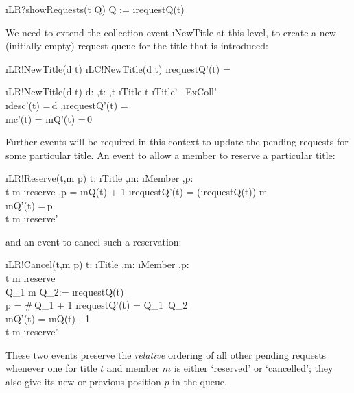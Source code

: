 \documentclass[12pt,a4paper]{article}
\begin{document}
\begin{showspecs}
	\begin{spec}{\i{LR?showRequests(t \to Q)}}
		Q := \i{requestQ}(t)
	\end{spec}
\end{showspecs}

\noindent We need to extend the collection event
\i{NewTitle} at this level, to create a new (initially-empty)
request queue for the title that is introduced:
\begin{showspecs}
	\begin{spec}{\i{LR!NewTitle(d \to t)}}
		\i{LC!NewTitle(d \to t)}
	\post	\i{requestQ'}(t) = \langle\rangle
	\end{spec}
\showbeside
	\begin{spec}[\equiv]{\i{LR!NewTitle(d \to t)}}
		d: \sep t: \sep t \notin \i{Title}
	\post	t \in \i{Title' \cap\, ExColl'}\\
		\i{desc'}(t) =\,d \sep \i{requestQ'}(t) = \langle\rangle\\
		\i{nc'}(t) = \i{nQ'}(t) =\,0
	\end{spec}
\end{showspecs}

\medskip\noindent Further events will be required in this context to
update the pending requests for some particular title.
An event to allow a member to reserve a particular title:
\begin{showspecs}
	\begin{spec}{\i{LR!Reserve(t,m \to p)}}
		t: \i{Title} \sep m: \i{Member} \sep p: \\
		t \mapsto m \notin \i{reserve} \sep p = \i{nQ(t)} + 1
	\post	\i{requestQ'}(t) = (\i{requestQ}(t)) \langle m \rangle\\
		\i{nQ'}(t) =\,p\\
		t \mapsto m \in \i{reserve'}
	\end{spec}
\end{showspecs}

\medskip\noindent and an event to cancel such a reservation:
\begin{showspecs}
	\begin{spec}{\i{LR!Cancel(t,m \to p)}}
		t: \i{Title} \sep m: \i{Member} \sep p: \\
		t \mapsto m \in \i{reserve} \\
		Q_1 \langle m \rangle Q_2:= \i{requestQ}(t)\\
        p = \#\,Q_1 + 1
	\post	\i{requestQ'}(t) =\; Q_1 \langle\rangle\,Q_2\\
		\i{nQ'}(t) = \i{nQ}(t) - 1\\
		t \mapsto m \notin \i{reserve'}
	\end{spec}
\end{showspecs}
\noindent These two events preserve the \emph{relative}
ordering of all other pending requests whenever one for
title $t$ and member $m$ is either `reserved' or `cancelled';
they also give its new or previous position $p$ in the queue.
\end{document}
